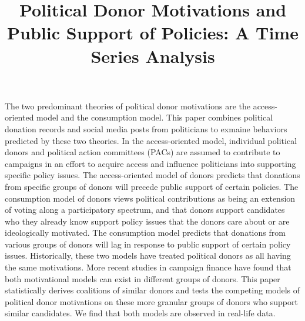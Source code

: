 \documentclass[12pt,]{article}
\title{Political Donor Motivations and Public Support of Policies: A Time
Series Analysis  }
\author{\Large \vspace{0.05in} \newline\normalsize\emph{}  }
\date{}
\newcommand*{\authorfont}{\fontfamily{phv}\selectfont}
\renewenvironment{abstract}
 {{%
    \setlength{\leftmargin}{0mm}
    \setlength{\rightmargin}{\leftmargin}%
  }%
  \relax}
 {\endlist}
\begin{document}
	
%

{%
\setlength{\parindent}{0pt}
\thispagestyle{plain}
{\fontsize{18}{20}\selectfont\raggedright 
\maketitle  %

}

{
   \vskip 13.5pt\relax \normalsize\fontsize{11}{12} 
\textbf{\authorfont } \hskip 15pt \emph{\small }   

}

}








\begin{abstract}

    \hbox{\vrule height .2pt width 39.14pc}

    \vskip 8.5pt %

\noindent The two predominant theories of political donor motivations are the
access-oriented model and the consumption model. This paper combines
political donation records and social media posts from politicians to
exmaine behaviors predicted by these two theories. In the
access-oriented model, individual political donors and political action
committees (PACs) are assumed to contribute to campaigns in an effort to
acquire access and influence politicians into supporting specific policy
issues. The access-oriented model of donors predicts that donations from
specific groups of donors will precede public support of certain
policies. The consumption model of donors views political contributions
as being an extension of voting along a participatory spectrum, and that
donors support candidates who they already know support policy issues
that the donors care about or are ideologically motivated. The
consumption model predicts that donations from various groups of donors
will lag in response to public support of certain policy issues.
Historically, these two models have treated political donors as all
having the same motivations. More recent studies in campaign finance
have found that both motivational models can exist in different groups
of donors. This paper statistically derives coalitions of similar donors
and tests the competing models of political donor motivations on these
more granular groups of donors who support similar candidates. We find
that both models are observed in real-life data.


    \hbox{\vrule height .2pt width 39.14pc}


\end{abstract}
\end{document}

